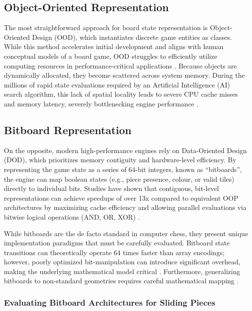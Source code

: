\subsection{Object-Oriented Representation}

The most straightforward approach for board state representation is Object-Oriented Design (OOD), which instantiates discrete game entities as classes. While this method accelerates initial development and aligns with human conceptual models of a board game, OOD struggles to efficiently utilize computing resources in performance-critical applications \cite{wingqvist2022dod}. Because objects are dynamically allocated, they become scattered across system memory. During the millions of rapid state evaluations required by an Artificial Intelligence (AI) search algorithm, this lack of spatial locality leads to severe CPU cache misses and memory latency, severely bottlenecking engine performance \cite{arantes2025impact}.

\subsection{Bitboard Representation}

On the opposite, modern high-performance engines rely on Data-Oriented Design (DOD), which prioritizes memory contiguity and hardware-level efficiency. By representing the game state as a series of 64-bit integers, known as ``bitboards'', the engine can map boolean states (e.g., piece presence, colour, or valid tiles) directly to individual bits. Studies have shown that contiguous, bit-level representations can achieve speedups of over 13x compared to equivalent OOP architectures by maximizing cache efficiency and allowing parallel evaluations via bitwise logical operations (AND, OR, XOR) \cite{wingqvist2022dod}.

While bitboards are the de facto standard in computer chess, they present unique implementation paradigms that must be carefully evaluated. Bitboard state transitions can theoretically operate 64 times faster than array encodings; however, poorly optimized bit-manipulation can introduce significant overhead, making the underlying mathematical model critical \cite{segundo2006}. Furthermore, generalizing bitboards to non-standard geometries requires careful mathematical mapping \cite{browne2014bitboards}.

\subsubsection{Evaluating Bitboard Architectures for Sliding Pieces}

